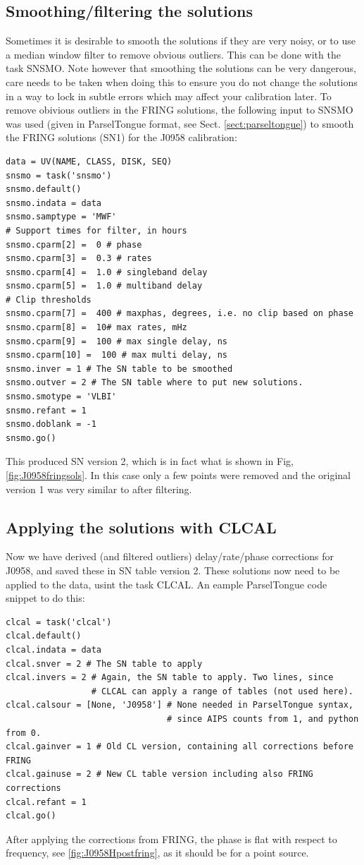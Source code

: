 \subsection{Smoothing/filtering the solutions}
Sometimes it is desirable to smooth the solutions if they are very noisy, or to
use a median window filter to remove obvious outliers. This can be done with
the task SNSMO. Note however that smoothing the solutions can be very
dangerous, care needs to be taken when doing this to ensure you do not change
the solutions in a way to lock in subtle errors which may affect your
calibration later. 
To remove obivious outliers in the FRING solutions, the following
input to SNSMO was used (given in ParselTongue format, see Sect. \ref{sect:parseltongue})
to smooth the FRING solutions (SN1) for the J0958 calibration:
\begin{lstlisting}
data = UV(NAME, CLASS, DISK, SEQ)
snsmo = task('snsmo')
snsmo.default()
snsmo.indata = data
snsmo.samptype = 'MWF'
# Support times for filter, in hours
snsmo.cparm[2] =  0 # phase
snsmo.cparm[3] =  0.3 # rates
snsmo.cparm[4] =  1.0 # singleband delay
snsmo.cparm[5] =  1.0 # multiband delay
# Clip thresholds
snsmo.cparm[7] =  400 # maxphas, degrees, i.e. no clip based on phase
snsmo.cparm[8] =  10# max rates, mHz
snsmo.cparm[9] =  100 # max single delay, ns
snsmo.cparm[10] =  100 # max multi delay, ns
snsmo.inver = 1 # The SN table to be smoothed
snsmo.outver = 2 # The SN table where to put new solutions.
snsmo.smotype = 'VLBI'
snsmo.refant = 1
snsmo.doblank = -1
snsmo.go()
\end{lstlisting}
This produced SN version 2, which is in fact what is shown in Fig,
\ref{fig:J0958fringsols}. In this case only a few points were removed and the
original version 1 was very similar to after filtering. 

\subsection{Applying the solutions with CLCAL}
Now we have derived (and filtered outliers) delay/rate/phase corrections for J0958, and
saved these in SN table version 2. These solutions now need to be applied to the data,
usint the task CLCAL. An eample ParselTongue code snippet to do this:
\begin{lstlisting}
clcal = task('clcal')
clcal.default()
clcal.indata = data
clcal.snver = 2 # The SN table to apply
clcal.invers = 2 # Again, the SN table to apply. Two lines, since 
                 # CLCAL can apply a range of tables (not used here).
clcal.calsour = [None, 'J0958'] # None needed in ParselTongue syntax, 
                                # since AIPS counts from 1, and python from 0.
clcal.gainver = 1 # Old CL version, containing all corrections before FRING
clcal.gainuse = 2 # New CL table version including also FRING corrections
clcal.refant = 1
clcal.go()
\end{lstlisting}
After applying the corrections from FRING, the phase is flat with respect to
frequency, see \ref{fig:J0958Hpostfring}, as it should be for a point
source.


